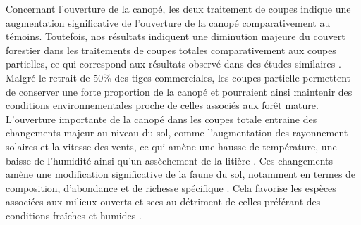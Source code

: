


Concernant l'ouverture de la canopé, les deux traitement de coupes indique une augmentation significative de l'ouverture de la canopé comparativement au témoins. 
Toutefois, nos résultats indiquent une diminution majeure du couvert forestier dans les traitements de coupes totales comparativement aux coupes partielles, ce qui correspond aux résultats observé dans des études similaires \citep{Nolet2018Comparingeffects,Mazerolle2021Woodlandsalamander}. 
Malgré le retrait de 50\% des tiges commerciales, les coupes partielle permettent de conserver une forte proportion de la canopé et pourraient ainsi maintenir des conditions environnementales proche de celles associés aux forêt mature. 
L'ouverture importante de la canopé dans les coupes totale entraine des changements majeur au niveau du sol, comme l'augmentation des rayonnement solaires et la vitesse des vents, ce qui amène une hausse de température, une baisse de l'humidité ainsi qu'un assèchement de la litière \citep{Keenan1993ecologicaleffects,Chen1999MicroclimateForest,Lindo2003Microbialbiomass,Brooks2008Forestfloor}. 
Ces changements amène une modification significative de la faune du sol, notamment en termes de composition, d'abondance et de richesse spécifique \citep{Staab2023Insectdecline}. 
Cela favorise les espèces associées aux milieux ouverts et secs au détriment de celles préférant des conditions fraîches et humides \citep{Niemela2007effectsforestry,Ochs2022Responseterrestrial,Staab2023Insectdecline}.




